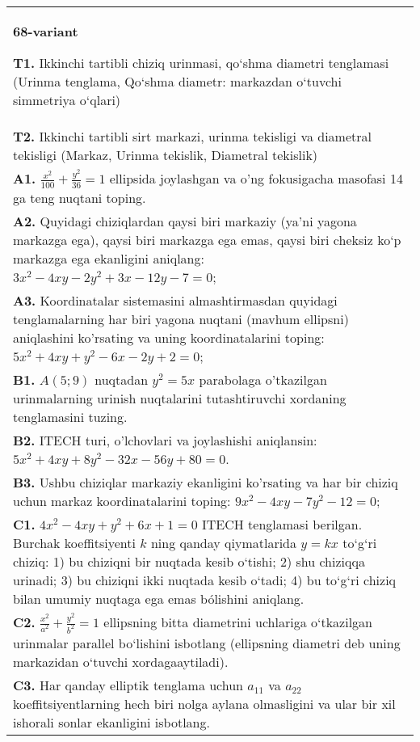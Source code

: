 \documentclass{article}
\begin{document}
\begin{tabular}{m{17cm}}
\textbf{68-variant}
\newline

\textbf{T1.} Ikkinchi tartibli chiziq urinmasi, qo‘shma diametri tenglamasi (Urinma tenglama, Qo‘shma diametr: markazdan o‘tuvchi simmetriya o‘qlari) \\
\textbf{T2.} Ikkinchi tartibli sirt markazi, urinma tekisligi va diametral tekisligi (Markaz, Urinma tekislik, Diametral tekislik) \\
\textbf{A1.} $\frac{x^2}{100}+\frac{y^2}{36}=1$ ellipsida joylashgan va o'ng fokusigacha masofasi 14 ga teng nuqtani toping. \\
\textbf{A2.} Quyidagi chiziqlardan qaysi biri markaziy (ya’ni yagona markazga ega), qaysi biri markazga ega emas, qaysi biri cheksiz ko‘p markazga ega ekanligini aniqlang: $3 x^2-4 x y-2 y^2+3 x-12 y-7=0$; \\
\textbf{A3.} Koordinatalar sistemasini almashtirmasdan quyidagi tenglamalarning har biri yagona nuqtani (mavhum ellipsni) aniqlashini ko'rsating va uning koordinatalarini toping: $5 x^2+4 x y+y^2-6 x-2 y+2=0$; \\
\textbf{B1.} $A(5;9)$ nuqtadan $y^2=5x$ parabolaga o'tkazilgan urinmalarning urinish nuqtalarini tutashtiruvchi xordaning tenglamasini tuzing. \\
\textbf{B2.} ITECH turi, o'lchovlari va joylashishi aniqlansin: $5 x^2+4 x y+8 y^2-32 x-56 y+80=0$. \\
\textbf{B3.} Ushbu chiziqlar markaziy ekanligini ko'rsating va har bir chiziq uchun markaz koordinatalarini toping: $9 x^2-4 x y-7 y^2-12=0$; \\
\textbf{C1.} $4 x^2-4 x y+y^2+6 x+1=0$ ITECH tenglamasi berilgan. Burchak koeffitsiyenti $k$ ning qanday qiymatlarida $y=kx$ to‘g‘ri chiziq: 1) bu chiziqni bir nuqtada kesib o‘tishi; 2) shu chiziqqa urinadi; 3) bu chiziqni ikki nuqtada kesib o‘tadi; 4) bu to‘g‘ri chiziq bilan umumiy nuqtaga ega emas bólishini aniqlang. \\
\textbf{C2.} $\frac{x^2}{a^2}+\frac{y^2}{b^2}=1$ ellipsning bitta diametrini uchlariga o‘tkazilgan urinmalar parallel bo‘lishini isbotlang (ellipsning diametri deb uning markazidan o‘tuvchi xordagaaytiladi). \\
\textbf{C3.} Har qanday elliptik tenglama uchun $a_{11}$ va $a_{22}$ koeffitsiyentlarning hech biri nolga aylana olmasligini va ular bir xil ishorali sonlar ekanligini isbotlang. \\

\end{tabular}
\vspace{1cm}
\end{document}
